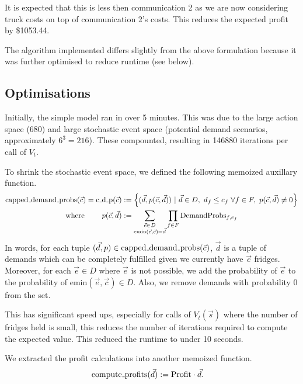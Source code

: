 \documentclass[11pt,a4paper]{article}
\begin{document}
It is expected that this is less then communication 2 as we are now considering 
truck costs on top of communication 2's costs. This 
reduces the expected profit by \$1053.44.

The algorithm implemented differs slightly from the above 
formulation because it was further optimised to reduce runtime (see below).

\subsection{Optimisations}
Initially, the simple model ran in over 5 minutes. This was due to the large 
action space (680) and large stochastic event space (potential demand scenarios, approximately $6^3=216$).
These compounted, resulting in 146880 iterations per call of $V_t$.

To shrink the stochastic event space, we defined the following memoized auxillary function.
\begin{align*}
    \mathrm{capped{\mathunderscore}demand{\mathunderscore}probs}(\vec c)  = \mathrm{c{\mathunderscore}d{\mathunderscore}p}(\vec c)&:= \left\{ (\vec d, p(\vec c, \vec d)) ~|~  \vec d \in D,~d_f \le c_f ~\forall f \in F, ~ p(\vec c, \vec d) \ne 0\right\} \\ 
    \text{where }\quad \quad p(\vec c, \vec d) &:= \sum_{\substack{\vec e \in D \\ \mathrm{emin}(\vec e, \vec c) = \vec d}} \prod_{f \in F}\mathrm{DemandProbs}_{f,e_f}
\end{align*}
In words, for each tuple $(\vec d, p) \in \mathrm{capped{\mathunderscore}demand{\mathunderscore}probs}(\vec c)$,
$\vec d$ is a tuple of demands which can be completely fulfilled given we currently have $\vec c$ 
fridges. Moreover, for each $\vec e \in D$ where $\vec e$ is not possible, we add 
the probability of $\vec e$ to the probability of $\mathrm{emin}(\vec e, \vec c) \in D$. 
Also, we remove demands with probability 0 from the set.

This has significant speed ups, especially for calls of $V_t(\vec s)$ where the number 
of fridges held is small, this reduces the number of iterations required to compute 
the expected value. This reduced the runtime to under 10 seconds.

We extracted the profit calculations into another memoized function. 
\begin{align*}
    \mathrm{compute{\mathunderscore}profits} (\vec d) &:=\mathrm{Profit} \cdot\vec d.
\end{align*}
\end{document}
